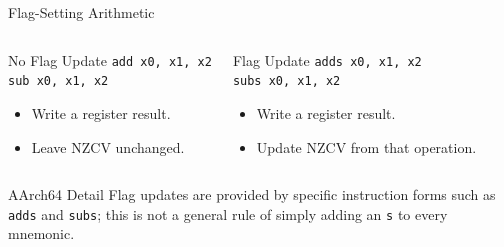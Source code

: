 \documentclass[aspectratio=169,11pt,t]{beamer}
\newcommand{\code}[1]{\texttt{#1}}
\begin{document}
\begin{frame}{Flag-Setting Arithmetic}
\begin{columns}[T,onlytextwidth]
\begin{block}{No Flag Update}
\large
\hspace{1.4cm}\code{add x0, x1, x2}\\[0.12cm]
\hspace{1.4cm}\code{sub x0, x1, x2}
\normalsize
\begin{itemize}
\item Write a register result.
\item Leave NZCV unchanged.
\end{itemize}
\end{block}
\begin{block}{Flag Update}
\large
\hspace{1.4cm}\code{adds x0, x1, x2}\\[0.12cm]
\hspace{1.4cm}\code{subs x0, x1, x2}
\normalsize
\begin{itemize}
\item Write a register result.
\item Update NZCV from that operation.
\end{itemize}
\end{block}
\end{columns}
\vspace{0.25cm}
\begin{block}{AArch64 Detail}
Flag updates are provided by specific instruction forms such as \code{adds} and \code{subs}; this is not a general rule of simply adding an \code{s} to every mnemonic.
\end{block}
\end{frame}










\end{document}
